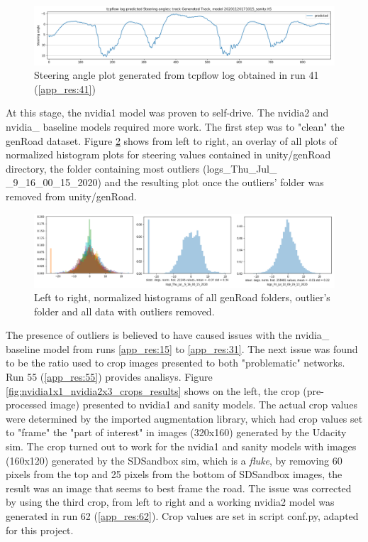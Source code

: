 \begin{figure}[ht]
 \centering 
 \includegraphics[width=\textwidth]{Figures/sa_GeneratedTrack_20201120171015_sanity.h5.png}
 \caption{Steering angle plot generated from tcpflow log obtained in run 41 (\ref{app_res:41})}
 \label{fig:sa_GeneratedTrack_20201120171015_sanity} 
\end{figure}

At this stage, the nvidia1 model was proven to self-drive. The nvidia2 and nvidia\_ baseline models required more work. The first step was to "clean" the genRoad dataset. %
Figure \ref{fig:SkewCleanup} shows from left to right, an overlay of all plots of normalized histogram plots for steering values contained in unity/genRoad directory, the folder containing most outliers (logs\_Thu\_Jul\_ \_9\_16\_00\_15\_2020) and the resulting plot once the outliers' folder was removed from unity/genRoad. 
\begin{figure}[h!]
\centering
\includegraphics[width=\textwidth]{Figures/SkewCleanup.png}
\caption{Left to right, normalized histograms of all genRoad folders, outlier's folder and all data with outliers removed.}
\label{fig:SkewCleanup}
\end{figure}
The presence of outliers is believed to have caused issues with the nvidia\_ baseline model from runs \ref{app_res:15} to \ref{app_res:31}. The next issue was found to be the ratio used to crop images presented to both "problematic" networks. Run 55 (\ref{app_res:55}) provides analisys. Figure \ref{fig:nvidia1x1_nvidia2x3_crops_results} shows on the left, the crop (pre-processed image) presented to nvidia1 and sanity models. The actual crop values were determined by the imported augmentation library, which had crop values set to "frame" the "part of interest" in images (320x160) generated by the Udacity sim. The crop turned out to work for the nvidia1 and sanity models with images (160x120) generated by the SDSandbox sim, which is a \textit{fluke}, by removing 60 pixels from the top and 25 pixels from the bottom of SDSandbox images, the result was an image that seems to best frame the road. The issue was corrected by using the third crop, from left to right and a working nvidia2 model was generated in run 62 (\ref{app_res:62}). Crop values are set in script conf.py, adapted for this project.

